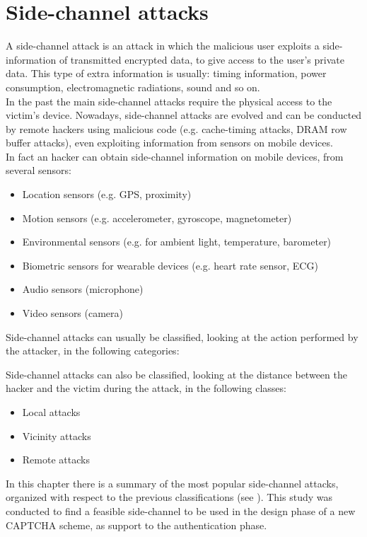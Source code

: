 \chapter{Side-channel attacks}\label{chapter:SideCH}
A side-channel attack is an attack in which the malicious user exploits a side-information of transmitted encrypted data, to give access to the user's private data. 
This type of extra information is usually: timing information, power consumption, electromagnetic radiations, sound and so on.\\
In the past the main side-channel attacks require the physical access to the victim's device. Nowadays, side-channel attacks are evolved and can be conducted by remote hackers using malicious code (e.g. cache-timing attacks, DRAM row buffer attacks), even exploiting information from sensors on mobile devices\cite{side_classification}.\\
In fact an hacker can obtain side-channel information on mobile devices, from several sensors\cite{side_attacks}:
\begin{itemize}
\item{Location sensors (e.g. GPS, proximity)}
\item{Motion sensors (e.g. accelerometer, gyroscope, magnetometer)}
\item{Environmental sensors (e.g. for ambient light, temperature, barometer)}
\item{Biometric sensors for wearable devices (e.g. heart rate sensor, ECG)}
\item{Audio sensors (microphone)}
\item{Video sensors (camera)}
\end{itemize}
Side-channel attacks can usually be classified, looking at the action performed by the attacker, in the following categories:
\begin{itemize}
\end{itemize}
Side-channel attacks can also be classified, looking at the distance between the hacker and the victim during the attack, in the following classes:
\begin{itemize}
\item{Local attacks}
\item{Vicinity attacks}
\item{Remote attacks}
\end{itemize}
In this chapter there is a summary of the most popular side-channel attacks, organized with respect to the previous classifications (see ). This study was conducted to find a feasible side-channel to be used in the design phase of a new CAPTCHA scheme, as support to the authentication phase.

